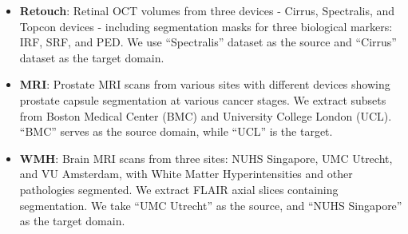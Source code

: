 \begin{itemize}
    \item{\textbf{Retouch}}: Retinal OCT volumes from three devices - Cirrus, Spectralis, and Topcon devices - including segmentation masks for three biological markers: IRF, SRF, and PED. We use ``Spectralis'' dataset as the source and ``Cirrus'' dataset as the target domain. 
    
    
    \item{\textbf{MRI}}: Prostate MRI scans from various sites with different devices showing prostate capsule segmentation at various cancer stages. We extract subsets from Boston Medical Center (BMC) and University College London (UCL). ``BMC'' serves as the source domain, while ``UCL'' is the target.
    
    
    \item{\textbf{WMH}}: Brain MRI scans from three sites: NUHS Singapore, UMC Utrecht, and VU Amsterdam, with White Matter Hyperintensities and other pathologies segmented. We extract FLAIR axial slices containing segmentation. We take ``UMC Utrecht'' as the source, and ``NUHS Singapore'' as the target domain.
    


\end{itemize}
